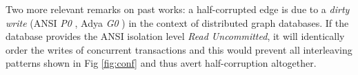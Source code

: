Two more relevant remarks on past works:
a half-corrupted edge is due to a \emph{dirty write} (ANSI \emph{P0} \cite{Berenson1995}, Adya \emph{G0} \cite{Adya2000}) in the context of distributed graph databases. If the database provides the ANSI isolation level \emph{Read Uncommitted}, it will identically order the writes of concurrent transactions and this would prevent all interleaving patterns shown in Fig \ref{fig:conf} and thus avert half-corruption altogether.
